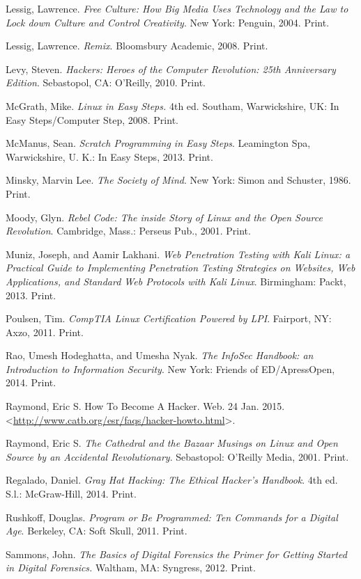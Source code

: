 \documentclass[letterpaper,10pt,english]{sphinxmanual}
\begin{document}
Lessig, Lawrence. \emph{Free Culture: How Big Media Uses Technology and the Law to Lock down Culture and Control Creativity}. New York: Penguin, 2004. Print.

Lessig, Lawrence. \emph{Remix}. Bloomsbury Academic, 2008. Print.

Levy, Steven. \emph{Hackers: Heroes of the Computer Revolution: 25th
Anniversary Edition}. Sebastopol, CA: O'Reilly, 2010. Print.

McGrath, Mike. \emph{Linux in Easy Steps.} 4th ed. Southam, Warwickshire, UK:
In Easy Steps/Computer Step, 2008. Print.

McManus, Sean. \emph{Scratch Programming in Easy Steps}. Leamington Spa,
Warwickshire, U. K.: In Easy Steps, 2013. Print.

Minsky, Marvin Lee. \emph{The Society of Mind}. New York: Simon and Schuster,
1986. Print.

Moody, Glyn. \emph{Rebel Code: The inside Story of Linux and the Open Source
Revolution}. Cambridge, Mass.: Perseus Pub., 2001. Print.

Muniz, Joseph, and Aamir Lakhani. \emph{Web Penetration Testing with Kali Linux: a Practical Guide to Implementing Penetration Testing Strategies on Websites, Web Applications, and Standard Web Protocols with Kali Linux}. Birmingham: Packt, 2013. Print.

Poulsen, Tim. \emph{CompTIA Linux Certification Powered by LPI}. Fairport, NY:
Axzo, 2011. Print.

Rao, Umesh Hodeghatta, and Umesha Nyak. \emph{The InfoSec Handbook: an Introduction to Information Security}. New York: Friends of ED/ApressOpen, 2014. Print.

Raymond, Eric S. How To Become A Hacker. Web. 24 Jan. 2015. \textless{}\href{http://www.catb.org/esr/faqs/hacker-howto.html}{http://www.catb.org/esr/faqs/hacker-howto.html}\textgreater{}.

Raymond, Eric S. \emph{The Cathedral and the Bazaar Musings on Linux and Open Source by an Accidental Revolutionary}. Sebastopol: O'Reilly Media,
2001. Print.

Regalado, Daniel. \emph{Gray Hat Hacking: The Ethical Hacker's Handbook}. 4th ed. S.l.: McGraw-Hill, 2014. Print.

Rushkoff, Douglas. \emph{Program or Be Programmed: Ten Commands for a Digital Age}. Berkeley, CA: Soft Skull, 2011. Print.

Sammons, John. \emph{The Basics of Digital Forensics the Primer for Getting Started in Digital Forensics.} Waltham, MA: Syngress, 2012. Print.
\end{document}
